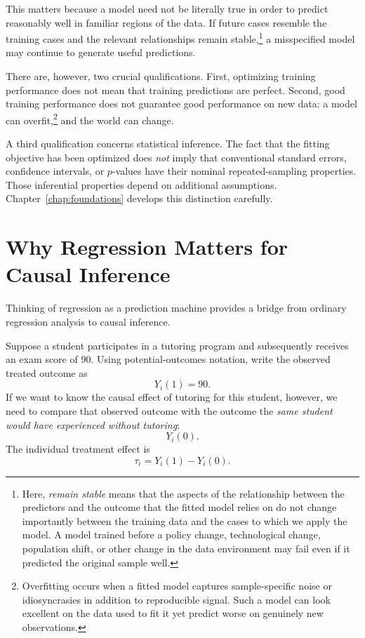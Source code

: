 \documentclass[11pt]{report}
\begin{document}
This matters because a model need not be literally true in order to predict reasonably well in familiar regions of the data. If future cases resemble the training cases and the relevant relationships remain stable,\footnote{Here, \emph{remain stable} means that the aspects of the relationship between the predictors and the outcome that the fitted model relies on do not change importantly between the training data and the cases to which we apply the model. A model trained before a policy change, technological change, population shift, or other change in the data environment may fail even if it predicted the original sample well.} a misspecified model may continue to generate useful predictions.

There are, however, two crucial qualifications. First, optimizing training performance does not mean that training predictions are perfect. Second, good training performance does not guarantee good performance on new data: a model can overfit,\footnote{Overfitting occurs when a fitted model captures sample-specific noise or idiosyncrasies in addition to reproducible signal. Such a model can look excellent on the data used to fit it yet predict worse on genuinely new observations.} and the world can change.

A third qualification concerns statistical inference. The fact that the fitting objective has been optimized does \emph{not} imply that conventional standard errors, confidence intervals, or \(p\)-values have their nominal repeated-sampling properties. Those inferential properties depend on additional assumptions. Chapter~\ref{chap:foundations} develops this distinction carefully.

\section{Why Regression Matters for Causal Inference}

Thinking of regression as a prediction machine provides a bridge from ordinary regression analysis to causal inference.

Suppose a student participates in a tutoring program and subsequently receives an exam score of \(90\). Using potential-outcomes notation, write the observed treated outcome as
\[
Y_i(1)=90.
\]
If we want to know the causal effect of tutoring for this student, however, we need to compare that observed outcome with the outcome the \emph{same student would have experienced without tutoring}:
\[
Y_i(0).
\]
The individual treatment effect is
\[
\tau_i=Y_i(1)-Y_i(0).
\]
\end{document}
